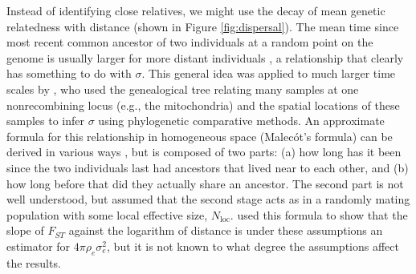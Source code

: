 \documentclass{ar-1col}
\begin{document}
Instead of identifying close relatives,
we might use the decay of mean genetic relatedness with distance
(shown in Figure \ref{fig:dispersal}).
The mean time since most recent common ancestor 
of two individuals at a random point on the genome
is usually larger for more distant individuals \citep{ibd_review},
a relationship that clearly has something to do with $\sigma$.
This general idea was applied to much larger time scales by \citep{neigel1991estimation,neigel1993application},
who used the genealogical tree relating many samples at one nonrecombining locus
(e.g., the mitochondria) and the spatial locations of these samples
to infer $\sigma$ using phylogenetic comparative methods.
An approximate formula for this relationship
in homogeneous space (Malec\'ot's formula)
can be derived in various ways 
\citep{malecot, sawyer1976branching, rousset_1997, barton-depaulis-etheridge, robledoarnuncio, ringbauer2017inferring, alasadi2018estimating},
but is composed of two parts: 
(a) how long has it been since the two individuals last had ancestors that lived near to each other,
and (b) how long before that did they actually share an ancestor.
The second part is not well understood,
but \citet{malecot} assumed that the second stage acts as in a randomly mating population
with some local effective size, $N_\text{loc}$.
\citet{rousset_1997} used this formula to show that
the slope of $F_{ST}$ against the logarithm of distance
is under these assumptions an estimator for $4 \pi \rho_e \sigma_e^2$,
but it is not known to what degree the assumptions affect the results.
\end{document}
